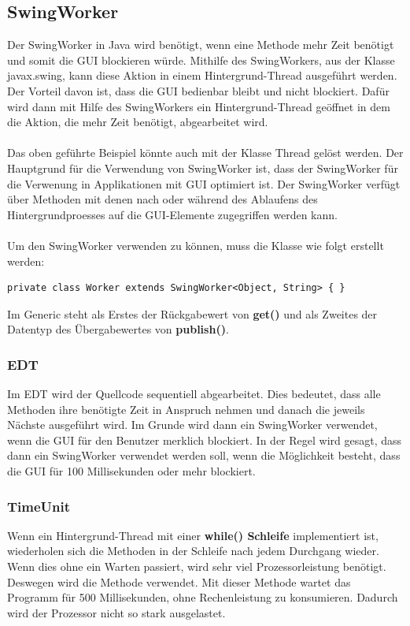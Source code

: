 \subsection{SwingWorker}
Der SwingWorker in Java wird benötigt, wenn eine Methode mehr Zeit benötigt und somit die GUI blockieren würde. Mithilfe des SwingWorkers, aus der Klasse javax.swing, kann diese Aktion in einem Hintergrund-Thread ausgeführt werden. Der Vorteil davon ist, dass die GUI bedienbar bleibt und nicht blockiert. Dafür wird dann mit Hilfe des SwingWorkers ein Hintergrund-Thread geöffnet in dem die Aktion, die mehr Zeit benötigt, abgearbeitet wird.
\\ \\
Das oben geführte Beispiel könnte auch mit der Klasse Thread gelöst werden. Der Hauptgrund für die Verwendung von SwingWorker ist, dass der SwingWorker für die Verwenung in Applikationen mit GUI optimiert ist. Der SwingWorker verfügt über Methoden mit denen nach oder während des Ablaufens des Hintergrundproesses auf die GUI-Elemente zugegriffen werden kann.
\\ \\ 
Um den SwingWorker verwenden zu können, muss die Klasse wie folgt erstellt werden:
\begin{lstlisting}[style=JavaStyle, caption=SwingWorker Klasse erstellen]
	private class Worker extends SwingWorker<Object, String> { } 
\end{lstlisting}
Im Generic steht als Erstes der Rückgabewert von \textbf{get()} und als Zweites der Datentyp des Übergabewertes von \textbf{publish()}.

\subsubsection{EDT}
Im \ac{EDT} wird der Quellcode sequentiell abgearbeitet. Dies bedeutet, dass alle Methoden ihre benötigte Zeit in Anspruch nehmen und danach die jeweils Nächste ausgeführt wird. Im Grunde wird dann ein SwingWorker verwendet, wenn die GUI für den Benutzer merklich blockiert. In der Regel wird gesagt, dass dann ein SwingWorker verwendet werden soll, wenn die Möglichkeit besteht, dass die GUI für 100 Millisekunden oder mehr blockiert.

\subsubsection{TimeUnit}
Wenn ein Hintergrund-Thread mit einer \textbf{while() Schleife} implementiert ist, wiederholen sich die Methoden in der Schleife nach jedem Durchgang wieder. Wenn dies ohne ein Warten passiert, wird sehr viel Prozessorleistung benötigt. Deswegen wird die Methode  verwendet. Mit dieser Methode wartet das Programm für 500 Millisekunden, ohne Rechenleistung zu konsumieren. Dadurch wird der Prozessor nicht so stark ausgelastet. 

